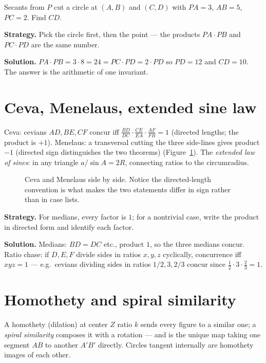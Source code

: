 \begin{example}
Secants from $P$ cut a circle at $(A,B)$ and $(C,D)$ with $PA=3$,
$AB=5$, $PC=2$. Find $CD$.

\textbf{Strategy.} Pick the circle first, then the point --- the
products $PA\cdot PB$ and $PC\cdot PD$ are the same number.

\textbf{Solution.} $PA\cdot PB = 3\cdot 8 = 24 = PC\cdot PD = 2\cdot PD$
so $PD=12$ and $CD=10$. The answer is the arithmetic of one invariant.
\end{example}

\section{Ceva, Menelaus, extended sine law}
Ceva: cevians $AD,BE,CF$ concur iff $\frac{BD}{DC}\cdot
\frac{CE}{EA}\cdot\frac{AF}{FB}=1$ (directed lengths; the product is
$+1$). Menelaus: a transversal cutting the three side-lines gives
product $-1$ (directed sign distinguishes the two theorems)
(Figure~\ref{fig:ceva}). The \emph{extended law of sines}: in any
triangle $a/\sin A = 2R$, connecting ratios to the circumradius.
\begin{figure}[ht]\centering

\caption{Ceva and Menelaus side by side. Notice the directed-length
convention is what makes the two statements differ in sign rather than
in case lists.}
\label{fig:ceva}
\end{figure}
\begin{example}
\textbf{Strategy.} For medians, every factor is $1$; for a nontrivial
case, write the product in directed form and identify each factor.

\textbf{Solution.} Medians: $BD=DC$ etc., product $1$, so the three
medians concur. Ratio chase: if $D,E,F$ divide sides in ratios
$x,y,z$ cyclically, concurrence iff $xyz=1$ --- e.g.\ cevians dividing
sides in ratios $1/2, 3, 2/3$ concur since
$\tfrac12\cdot3\cdot\tfrac23=1$.
\end{example}

\section{Homothety and spiral similarity}
A homothety (dilation) at center $Z$ ratio $k$ sends every figure to a
similar one; a \emph{spiral similarity} composes it with a rotation ---
and is the unique map taking one segment $AB$ to another $A'B'$
directly. Circles tangent internally are homothety images of each other.

